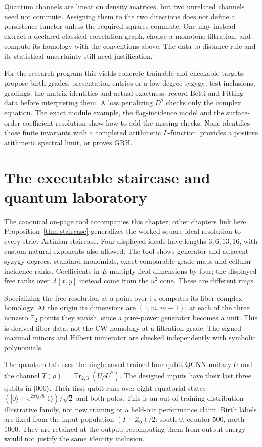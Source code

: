 \documentclass[11pt,oneside,openany]{book}
\theoremstyle{definition}\newtheorem{definition}[theorem]{Definition}
\theoremstyle{remark}\newtheorem{remark}[theorem]{Remark}
\begin{document}
Quantum channels are linear on density matrices, but two unrelated
channels need not commute. Assigning them to the two directions does
not define a persistence functor unless the required squares commute.
One may instead extract a declared classical correlation graph, choose
a monotone filtration, and compute its homology with the conventions
above. The data-to-distance rule and its statistical uncertainty still
need justification.

For the research program this yields concrete trainable and checkable
targets: propose birth grades, presentation entries or a low-degree
syzygy; test inclusions, gradings, the matrix identities and actual
exactness; record Betti and Fitting data before interpreting them.
A loss penalizing $D^2$ checks only the complex equation. The exact
module example, the flag-incidence model and the surface-order coefficient
resolution show how to add the missing checks. None identifies those
finite invariants with a completed arithmetic $L$-function, provides a
positive arithmetic spectral limit, or proves GRH.

\section{The executable staircase and quantum laboratory}
The canonical on-page tool accompanies this chapter; other chapters link
here. Proposition~\ref{thm:staircase} generalizes the worked square-ideal
resolution to every strict Artinian staircase. Four displayed ideals have
lengths $3,6,13,16$, with custom natural exponents also allowed. The tool
shows generator and adjacent-syzygy degrees, standard monomials, exact
comparable-grade maps and cellular incidence ranks. Coefficients in $E$
multiply field dimensions by four; the displayed free ranks over
$\Lambda[x,y]$ instead come from the $u^2$ cone. These are different rings.

Specializing the free resolution at a point over $\mathbb F_2$ computes
its fiber-complex homology. At the origin its dimensions are
$(1,m,m-1)$; at each of the three nonzero $\mathbb F_2$ points they vanish,
since a pure-power generator becomes a unit. This is derived fiber data,
not the CW homology at a filtration grade. The signed maximal minors and
Hilbert numerator are checked independently with symbolic polynomials.

The quantum tab uses the single saved trained four-qubit QCNN unitary $U$
and the channel $T(\rho)=\operatorname{Tr}_{2,3}(U\rho U^*)$.
The designed inputs have their last three qubits in $|000\rangle$.
Their first qubit runs over eight equatorial states
$(|0\rangle+e^{2\pi i j/8}|1\rangle)/\sqrt2$ and both poles.
This is an out-of-training-distribution illustrative family, not new
training or a held-out performance claim. Birth labels are fixed from the
input population $(I+Z_0)/2$: south $0$, equator $500$, north $1000$.
They are retained at the output; recomputing them from output energy
would not justify the same identity inclusion.
\end{document}
